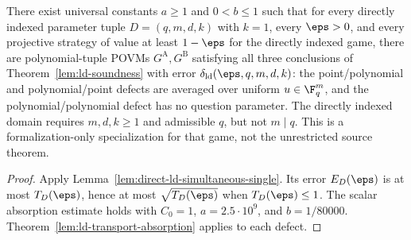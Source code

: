 \begin{theorem}[Formalization support: directly indexed soundness for $k=1$]
\label{lem:direct-ld-soundness-k-one}
\leanok
{}
There exist universal constants $a\ge1$ and $0<b\le1$ such that for
every directly indexed parameter tuple $D=(q,m,d,k)$ with $k=1$, every
$\eps>0$, and every projective strategy of value at least $1-\eps$
for the directly indexed game, there are polynomial-tuple POVMs
$G^{\mathrm A},G^{\mathrm B}$ satisfying all three conclusions of
Theorem~\ref{lem:ld-soundness} with error
$\delta_{\mathrm{ld}}(\eps,q,m,d,k)$: the point/polynomial and
polynomial/point defects are averaged over uniform $u\in\F_q^m$,
and the polynomial/polynomial defect has no question parameter.
The directly indexed domain requires $m,d,k\ge1$ and admissible $q$,
but not $m\mid q$. This is a formalization-only specialization for that
game, not the unrestricted source theorem.
\end{theorem}
\begin{proof}
\leanok
{}
Apply Lemma~\ref{lem:direct-ld-simultaneous-single}. Its error $E_D(\eps)$
is at most $T_D(\eps)$, hence at most $\sqrt{T_D(\eps)}$ when
$T_D(\eps)\le1$. The scalar absorption estimate holds with
$C_0=1$, $a=2.5\cdot10^9$, and $b=1/80000$.
Theorem~\ref{lem:ld-transport-absorption} applies to each defect.
\end{proof}

